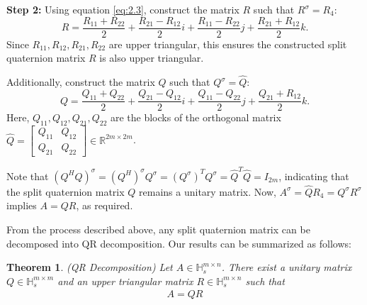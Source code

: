 \documentclass[5p]{elsarticle}
\newtheorem{theorem}{Theorem}[section]
\numberwithin{equation}{section}
\begin{document}
\textbf{Step 2:} Using equation \eqref{eq:2.3}, construct the matrix $R$ such that $R^\sigma=R_4:$
$$
R = \frac{R_{11} + R_{22}}{2} + \frac{R_{21} - R_{12}}{2}i + \frac{R_{11} - R_{22}}{2}j + \frac{R_{21} + R_{12}}{2}k.
$$
Since $R_{11}, R_{12}, R_{21}, R_{22}$ are upper triangular, this ensures the constructed split quaternion matrix $R$ is also upper triangular.


Additionally, construct the matrix $Q$ such that $Q^\sigma=\hat{Q}:$
$$
Q = \frac{Q_{11} + Q_{22}}{2} + \frac{Q_{21} - Q_{12}}{2}i + \frac{Q_{11} - Q_{22}}{2}j + \frac{Q_{21} + R_{12}}{2}k.
$$
Here,  $Q_{11}, 
 Q_{12}, Q_{21}, Q_{22}$ are the blocks of the orthogonal matrix $\hat{Q} = \begin{bmatrix} Q_{11} & Q_{12} \\ Q_{21} & Q_{22} \end{bmatrix} \in \mathbb{
 R}^{2m \times 2m}$.

Note that $(Q^H Q)^\sigma = {(Q^H)}^\sigma Q^\sigma = {(Q^\sigma)}^TQ^\sigma = \hat{Q}^T\hat{Q} = I_{2m}$, indicating that the split quaternion matrix $Q$ remains a unitary matrix.
Now, $A^\sigma=\hat{Q}R_4=Q^\sigma R^\sigma$ implies
$A = Q R$, as required.

From the process described above,  any split quaternion matrix can be decomposed into QR decomposition. Our results can be summarized as follows:
\begin{theorem}(QR Decomposition)
    Let $A \in \mathbb{H}_s^{m \times n}$. There exist a unitary matrix $Q \in \mathbb{H}_s^{m \times m}$ and an upper triangular matrix $R \in \mathbb{H}_s^{m \times n}$ such that
    \begin{eqnarray}\label{eq:split QR}
        A = Q R
    \end{eqnarray}
\end{theorem}
\end{document}
